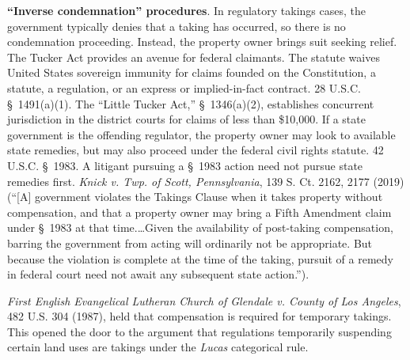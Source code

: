 \item \textbf{``Inverse condemnation'' procedures}. In regulatory takings
cases, the government typically denies that a taking has occurred, so there is
no condemnation proceeding. Instead, the property owner brings suit seeking
relief. The Tucker Act provides an avenue for federal claimants. The statute
waives United States sovereign immunity for claims founded on the Constitution,
a statute, a regulation, or an express or implied-in-fact contract. 28 U.S.C.
\S~1491(a)(1). The ``Little Tucker Act,'' \S~1346(a)(2), establishes concurrent
jurisdiction in the district courts for claims of less than \$10,000. If a state
government is the offending regulator, the property owner may look to available
state remedies, but may also proceed under the federal civil rights statute. 42
U.S.C. \S~1983. A litigant pursuing a \S~1983 action need not pursue state
remedies first. \emph{Knick v. Twp. of Scott, Pennsylvania}, 139 S. Ct. 2162,
2177 (2019) (``[A] government violates the Takings Clause when it takes property
without compensation, and that a property owner may bring a Fifth Amendment
claim under \S~1983 at that time.\ldots Given the availability of post-taking
compensation, barring the government from acting will ordinarily not be
appropriate. But because the violation is complete at the time of the taking,
pursuit of a remedy in federal court need not await any subsequent state
action.'').

\item \textit{First English Evangelical Lutheran Church of Glendale v. County of
Los Angeles}, 482 U.S. 304 (1987), held that compensation is required for
temporary takings. This opened the door to the argument that regulations
temporarily suspending certain land uses are takings under the \textit{Lucas}
categorical rule.



